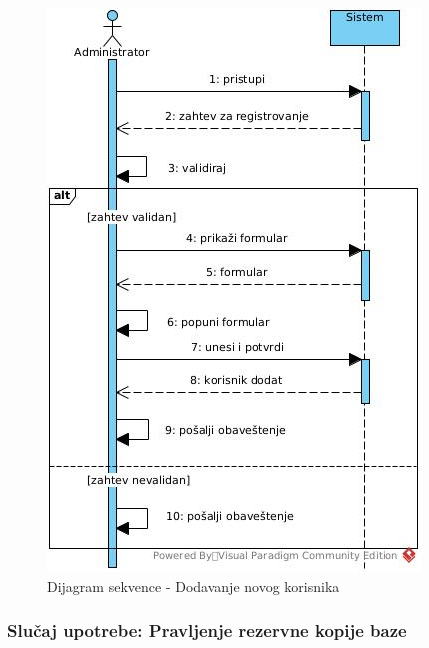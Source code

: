 \documentclass[titlepage]{article}
\begin{document}
\begin{figure}[H]
\centering
\includegraphics[scale=0.7]{Dodavanje_korisnika}
\caption{Dijagram sekvence - Dodavanje novog korisnika}
\label{slk:dodavanje}
\end{figure}

\subsubsection{Slučaj upotrebe: Pravljenje rezervne kopije baze}
\end{document}
